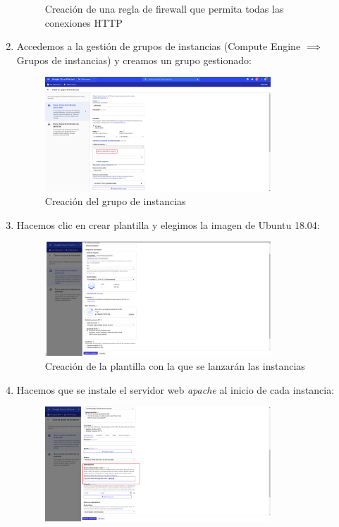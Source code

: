 \documentclass[12pt,spanish]{article}
\begin{document}
\begin{enumerate}
\begin{figure}[H]
			\caption{Creación de una regla de firewall que permita todas las conexiones HTTP}
		\end{figure}
	\item Accedemos a la gestión de grupos de instancias (Compute Engine $\implies$ Grupos de instancias) y creamos un grupo gestionado:
	\begin{figure}[H]
		\centering
		\includegraphics[width=0.8\textwidth]{project/createig.png}
		\caption{Creación del grupo de instancias}
	\end{figure}
	\newpage
	\item Hacemos clic en crear plantilla y elegimos la imagen de Ubuntu 18.04:
	\begin{figure}[H]
		\centering
		\includegraphics[width=0.8\textwidth]{project/createtemplate.png}
		\caption{Creación de la plantilla con la que se lanzarán las instancias}
	\end{figure}
	\item Hacemos que se instale el servidor web \emph{apache} al inicio de cada instancia:
	\begin{figure}[H]
		\centering
		\includegraphics[width=0.8\textwidth]{project/automation.png}

\end{figure}
\end{enumerate}
\end{document}
